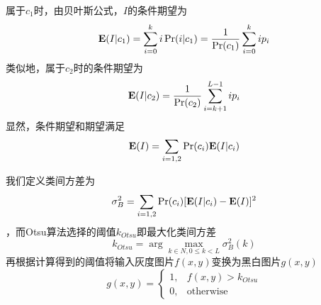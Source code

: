 属于$c_1$时，由贝叶斯公式，$I$的条件期望为
\begin{equation}
    \mathbf{E}(I|c_1) = \sum_{i=0}^k i \Pr(i | c_1) 
    = \frac{1}{\Pr(c_1)} \sum_{i=0}^k i p_i
\end{equation}
类似地，属于$c_2$时的条件期望为
\begin{equation}
    \mathbf{E}(I|c_2) = \frac{1}{\Pr(c_2)} \sum_{i=k+1}^{L-1}i p_i
\end{equation}
显然，条件期望和期望满足
\begin{equation}
    \mathbf{E}(I) = \sum_{i=1,2} \Pr(c_i) \mathbf{E}(I|c_i)
\end{equation}

我们定义类间方差为
\begin{equation}
    \sigma_B^2 = \sum_{i=1,2} \Pr(c_i) [ \mathbf{E}(I|c_i) - \mathbf{E}(I) ]^2
\end{equation}
，而Otsu算法选择的阈值$k_{Otsu}$即最大化类间方差
\begin{equation}
    k_{Otsu} = \arg \max_{k\in N, 0\leq k <L} \sigma_B^2 (k)
\end{equation}
再根据计算得到的阈值将输入灰度图片$f(x,y)$变换为黑白图片$g(x,y)$
\begin{equation}
    g(x,y) = \begin{cases}
        1, & f(x,y) > k_{Otsu} \\
        0, & \text{otherwise}
    \end{cases}
\end{equation}

